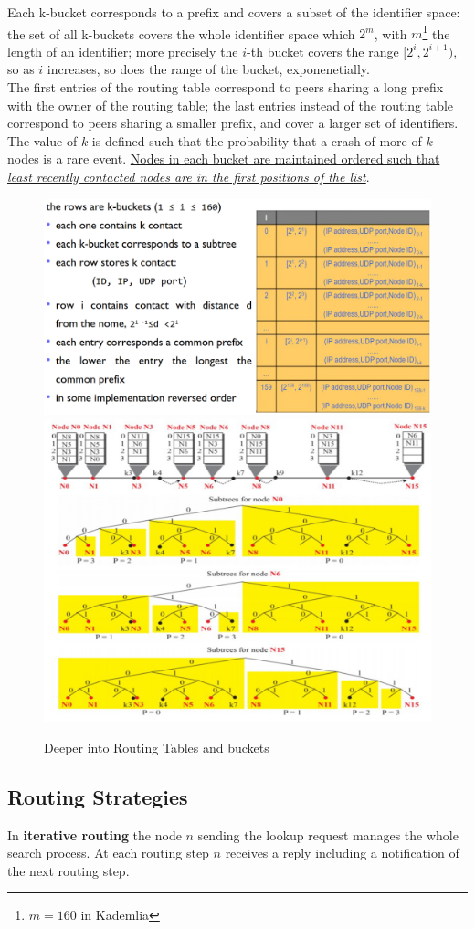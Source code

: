 Each k-bucket corresponds to a prefix and covers a subset of the identifier space: the set of all k-buckets covers the whole identifier space which $2^m$, with $m$\footnote{$m=160$ in Kademlia} the length of an identifier; more precisely the $i$-th bucket covers the range $[2^i, 2^{i+1})$, so as $i$ increases, so does the range of the bucket, exponenetially.\\
The first entries of the routing table correspond to peers sharing a long prefix
with the owner of the routing table; the last entries instead of the routing table correspond to peers sharing a smaller prefix, and cover a larger set of identifiers.
The value of $k$ is defined such that the probability that a crash of more of $k$ nodes is a rare event.
\ul{Nodes in each bucket are maintained ordered such that \textit{least recently contacted nodes are in the first positions of the list}}.
\newpage
\begin{figure}[htbp]
   \centering
   \includegraphics[width=0.45\columnwidth]{images/kademlia_routing_table1.png}
   \includegraphics[width=0.45\columnwidth]{images/kademlia_routing_table2.png}
   \label{fig:kademlia_routing_table}
   \caption{Deeper into Routing Tables and buckets}
\end{figure}

\subsection{Routing Strategies}
In \textbf{iterative routing} the node $n$ sending the lookup request manages the whole search process.
At each routing step  $n$ receives a reply including a notification of the next routing step.

